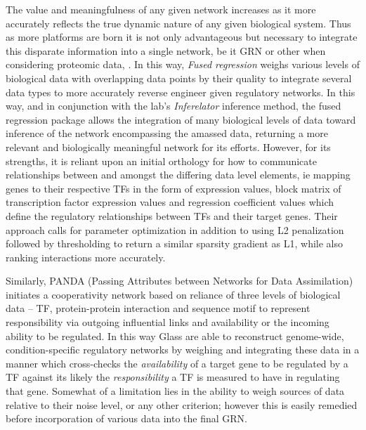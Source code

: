 The value and meaningfulness of any given network increases as it more accurately reflects the true dynamic nature of any given biological system. Thus as more platforms are born it is not only advantageous but necessary to integrate this disparate information into a single network, be it GRN or other when considering \eg proteomic data, \etc. In this way, \emph{Fused regression} \citep{lam2016fused} weighs various levels of biological data with overlapping data points by their quality to integrate several data types to more accurately reverse engineer given regulatory networks. In this way, and in conjunction with the lab's \emph{Inferelator}\citep{bonneau2006inferelator} inference method, the fused regression package allows the integration of many biological levels of data toward inference of the network encompassing the amassed data, returning a more relevant and biologically meaningful network for its efforts. However, for its strengths, it is reliant upon an initial orthology for how to communicate relationships between and amongst the differing data level elements, ie mapping genes to their respective TFs in the form of expression values, block matrix of transcription factor expression values and regression coefficient values which define the regulatory relationships between TFs and their target genes. Their approach  calls for parameter optimization in addition to using L2 penalization followed by thresholding to return a similar sparsity gradient as L1, while also ranking interactions more accurately.

Similarly, PANDA (Passing Attributes between Networks for Data Assimilation) initiates a cooperativity network based on reliance of three levels of biological data -- TF, protein-protein interaction and sequence motif to represent responsibility via outgoing influential links and availability or the incoming ability to be regulated. In this way Glass \etal \citep{glass2013passing} are able to reconstruct genome-wide, condition-specific regulatory networks by weighing and integrating these data in a manner which cross-checks the \emph{availability} of a target gene to be regulated by a TF against its likely the \emph{responsibility} a TF is measured to have in regulating that gene. Somewhat of a limitation lies in the ability to weigh sources of data relative to their noise level, or any other criterion; however this is easily remedied before incorporation of various data into the final GRN.

